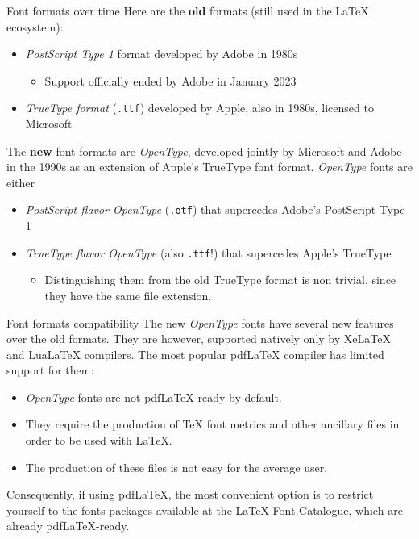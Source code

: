 \documentclass[]{beamer}
\newcommand{\hrefcol}[2]{\textcolor{uihteal}{\href{#1}{#2}}}
\begin{document}
\begin{frame}[fragile]{Font formats over time}
Here are the \textbf{old} formats (still used in the LaTeX ecosystem):

\begin{itemize}
\item \emph{PostScript Type 1} format developed by Adobe in 1980s
\begin{itemize}
    \item Support officially ended by Adobe in January 2023
\end{itemize}
\item \emph{TrueType format} (\verb|.ttf|) developed by Apple, also in 1980s, licensed to Microsoft
\end{itemize}

The \textbf{new} font formats are \emph{OpenType}, developed jointly by Microsoft and Adobe in the 1990s as an extension of Apple's TrueType font format. \emph{OpenType} fonts are either

\begin{itemize}
\item \emph{PostScript flavor OpenType} (\verb|.otf|) that supercedes Adobe's PostScript Type 1
\item \emph{TrueType flavor OpenType} (also \verb|.ttf|!) that supercedes Apple's TrueType
    \begin{itemize}
    \item Distinguishing them from the old TrueType format is non trivial, since they have the same file extension.
    \end{itemize}
\end{itemize}
\end{frame}


\begin{frame}[fragile]{Font formats compatibility}
The new \emph{OpenType} fonts have several new features over the old formats. They are however, supported natively only by XeLaTeX and LuaLaTeX compilers. The most popular pdfLaTeX compiler has limited support for them:
\begin{itemize}
\item \emph{OpenType} fonts are not pdfLaTeX-ready by default.
\item They require the production of TeX font metrics and other ancillary files in order to be used with LaTeX.
\item The production of these files is not easy for the average user.
\end{itemize}
Consequently, if using pdfLaTeX, the most convenient option is to restrict yourself to the fonts packages available at the \hrefcol{https://tug.org/FontCatalogue/}{LaTeX Font Catalogue}, which are already pdfLaTeX-ready.
\end{frame}
\end{document}
